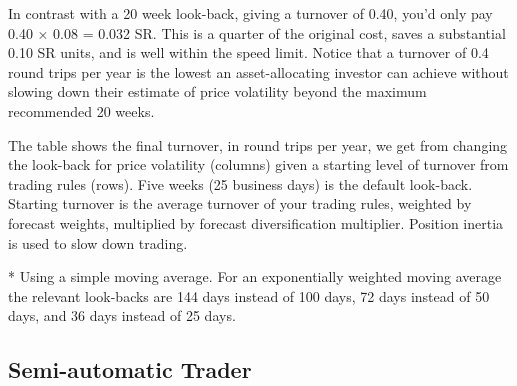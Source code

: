 In contrast with a 20 week look-back, giving a turnover of 0.40, you'd only pay 0.40 × 0.08 = 0.032 SR. This is a quarter of the original cost, saves a substantial 0.10 SR units, and is well within the speed limit. Notice that a turnover of 0.4 round trips per year is the lowest an asset-allocating investor can achieve without slowing down their estimate of price volatility beyond the maximum recommended 20 weeks.

 

The table shows the final turnover, in round trips per year, we get from changing the look-back for price volatility (columns) given a starting level of turnover from trading rules (rows). Five weeks (25 business days) is the default look-back. Starting turnover is the average turnover of your trading rules, weighted by forecast weights, multiplied by forecast diversification multiplier. Position inertia is used to slow down trading.

* Using a simple moving average. For an exponentially weighted moving average the relevant look-backs are 144 days instead of 100 days, 72 days instead of 50 days, and 36 days instead of 25 days.

\subsection*{Semi-automatic Trader}

